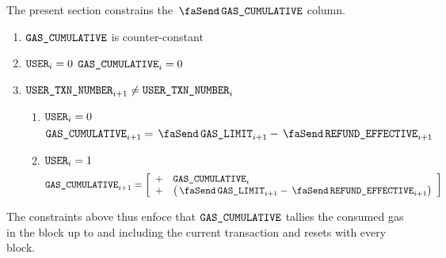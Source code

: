 The present section constrains the $\txCumulativeConsumedGas$ column. 
\begin{enumerate}
	\item $\texttt{GAS\_CUMULATIVE}$ is counter-constant
	\item \If $\texttt{USER} _{i} = 0$ \Then $\texttt{GAS\_CUMULATIVE} _{i} = 0$
	\item \If $\texttt{USER}\texttt{\_}\texttt{TXN\_NUMBER} _{i + 1} \neq \texttt{USER}\texttt{\_}\texttt{TXN\_NUMBER} _{i}$ \Then
		\begin{enumerate}
			\item \If $\texttt{USER} _{i} = 0$ \Then
				\[
					\cumulativeConsumedGas _{i + 1} = \txGasLimit _{i + 1} - \txEffectiveRefund_{i + 1}
				\]
			\item \If $\texttt{USER} _{i} = 1$ \Then
				\[
					\cumulativeConsumedGas _{i + 1} 
					=
					\left[ \begin{array}{ll}
						+ & \cumulativeConsumedGas _{i}                           \\
						+ & \big(\txGasLimit_{i + 1} - \txEffectiveRefund_{i + 1}\big) \\
					\end{array}\right]
				\]
		\end{enumerate}
\end{enumerate}
The constraints above thus enfoce that $\texttt{GAS\_CUMULATIVE}$ tallies the consumed gas in the block up to and including the current transaction and resets with every block.

